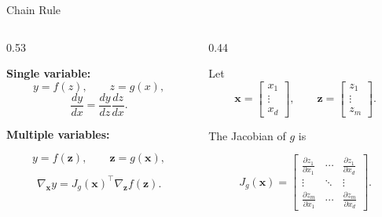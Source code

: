 \documentclass[aspectratio=169,12pt]{beamer}
\begin{document}
\begin{frame}[t]{Chain Rule}
	
	\begin{columns}[T]
		
		\begin{column}{0.53\textwidth}
			
			\textbf{Single variable:}
			\[
			y = f(z), \qquad z = g(x),
			\]
			\[
			\frac{dy}{dx}
			=
			\frac{dy}{dz}
			\frac{dz}{dx}.
			\]
			
			\vspace{0.3cm}
			
			\textbf{Multiple variables:}
			
			\[
			y = f(\mathbf{z}),
			\qquad
			\mathbf{z} = g(\mathbf{x}),
			\]
			
			\[
			\nabla_{\mathbf{x}} y
			=
			J_g(\mathbf{x})^\top
			\nabla_{\mathbf{z}} f(\mathbf{z}).
			\]
			
		\end{column}
		
		\begin{column}{0.44\textwidth}
			
			\small
			
			Let
			\[
			\mathbf{x} =
			\begin{bmatrix}
				x_1 \\ \vdots \\ x_d
			\end{bmatrix},
			\qquad
			\mathbf{z} =
			\begin{bmatrix}
				z_1 \\ \vdots \\ z_m
			\end{bmatrix}.
			\]
			
			The Jacobian of $g$ is
			
			\[
			J_g(\mathbf{x})
			=
			\begin{bmatrix}
				\frac{\partial z_1}{\partial x_1}
				&
				\cdots
				&
				\frac{\partial z_1}{\partial x_d}
				\\[4pt]
				\vdots
				&
				\ddots
				&
				\vdots
				\\[4pt]
				\frac{\partial z_m}{\partial x_1}
				&
				\cdots
				&
				\frac{\partial z_m}{\partial x_d}
			\end{bmatrix}.
			\]
			
		\end{column}
		
	\end{columns}
	
\end{frame}
\end{document}
